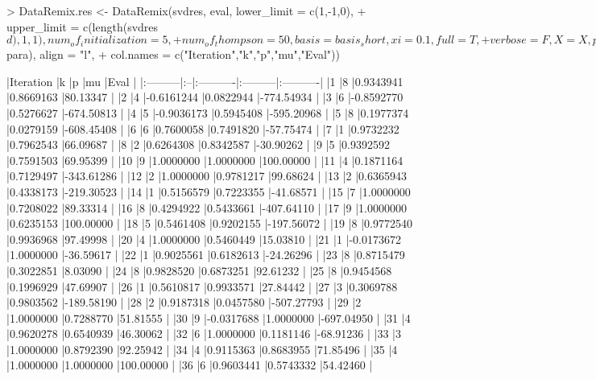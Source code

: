 \documentclass{article}
\begin{document}
\begin{Schunk}
\begin{Sinput}
> DataRemix.res <- DataRemix(svdres, eval, lower_limit = c(1,-1,0), 
+                  upper_limit = c(length(svdres$d), 1,1), num_of_initialization = 5,
+                  num_of_thompson = 50, basis = basis_short, xi = 0.1, full = T, 
+                  verbose = F, X = X, penalty = 100)
> knitr::kable(cbind(1:55,DataRemix.res$para), align = "l", 
+              col.names = c("Iteration","k","p","mu","Eval"))
\end{Sinput}
\begin{Soutput}
|Iteration |k  |p          |mu        |Eval       |
|:---------|:--|:----------|:---------|:----------|
|1         |8  |0.9343941  |0.8669163 |80.13347   |
|2         |4  |-0.6161244 |0.0822944 |-774.54934 |
|3         |6  |-0.8592770 |0.5276627 |-674.50813 |
|4         |5  |-0.9036173 |0.5945408 |-595.20968 |
|5         |8  |0.1977374  |0.0279159 |-608.45408 |
|6         |6  |0.7600058  |0.7491820 |-57.75474  |
|7         |1  |0.9732232  |0.7962543 |66.09687   |
|8         |2  |0.6264308  |0.8342587 |-30.90262  |
|9         |5  |0.9392592  |0.7591503 |69.95399   |
|10        |9  |1.0000000  |1.0000000 |100.00000  |
|11        |4  |0.1871164  |0.7129497 |-343.61286 |
|12        |2  |1.0000000  |0.9781217 |99.68624   |
|13        |2  |0.6365943  |0.4338173 |-219.30523 |
|14        |1  |0.5156579  |0.7223355 |-41.68571  |
|15        |7  |1.0000000  |0.7208022 |89.33314   |
|16        |8  |0.4294922  |0.5433661 |-407.64110 |
|17        |9  |1.0000000  |0.6235153 |100.00000  |
|18        |5  |0.5461408  |0.9202155 |-197.56072 |
|19        |8  |0.9772540  |0.9936968 |97.49998   |
|20        |4  |1.0000000  |0.5460449 |15.03810   |
|21        |1  |-0.0173672 |1.0000000 |-36.59617  |
|22        |1  |0.9025561  |0.6182613 |-24.26296  |
|23        |8  |0.8715479  |0.3022851 |8.03090    |
|24        |8  |0.9828520  |0.6873251 |92.61232   |
|25        |8  |0.9454568  |0.1996929 |47.69907   |
|26        |1  |0.5610817  |0.9933571 |27.84442   |
|27        |3  |0.3069788  |0.9803562 |-189.58190 |
|28        |2  |0.9187318  |0.0457580 |-507.27793 |
|29        |2  |1.0000000  |0.7288770 |51.81555   |
|30        |9  |-0.0317688 |1.0000000 |-697.04950 |
|31        |4  |0.9620278  |0.6540939 |46.30062   |
|32        |6  |1.0000000  |0.1181146 |-68.91236  |
|33        |3  |1.0000000  |0.8792390 |92.25942   |
|34        |4  |0.9115363  |0.8683955 |71.85496   |
|35        |4  |1.0000000  |1.0000000 |100.00000  |
|36        |6  |0.9603441  |0.5743332 |54.42460   |

\end{Soutput}
\end{Schunk}
\end{document}
